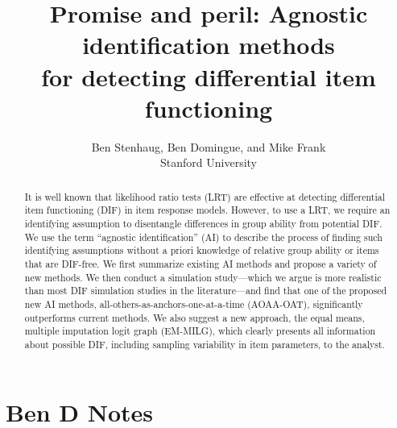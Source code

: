 \documentclass[
  11pt,
]{article}
\title{Promise and peril: Agnostic identification methods\\
for detecting differential item functioning}
\subtitle{Ben Stenhaug, Ben Domingue, and Mike Frank\\
Stanford University}
\author{}
\date{\vspace{-2.5em}}
\begin{document}
\maketitle
\begin{abstract}
It is well known that likelihood ratio tests (LRT) are effective at detecting differential item functioning (DIF) in item response models. However, to use a LRT, we require an identifying assumption to disentangle differences in group ability from potential DIF. We use the term ``agnostic identification'' (AI) to describe the process of finding such identifying assumptions without a priori knowledge of relative group ability or items that are DIF-free. We first summarize existing AI methods and propose a variety of new methods. We then conduct a simulation study---which we argue is more realistic than most DIF simulation studies in the literature---and find that one of the proposed new AI methods, all-others-as-anchors-one-at-a-time (AOAA-OAT), significantly outperforms current methods. We also suggest a new approach, the equal means, multiple imputation logit graph (EM-MILG), which clearly presents all information about possible DIF, including sampling variability in item parameters, to the analyst. \clearpage
\end{abstract}

{
\setcounter{tocdepth}{5}
\tableofcontents
}
\clearpage

\hypertarget{ben-d-notes}{%
\section{Ben D Notes}\label{ben-d-notes}}
\end{document}
